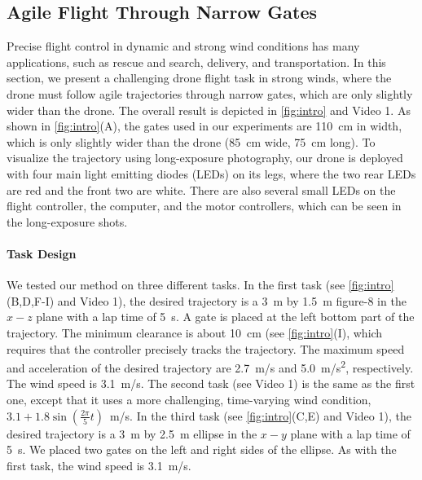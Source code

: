 \subsection*{Agile Flight Through Narrow Gates}
Precise flight control in dynamic and strong wind conditions has many applications, such as rescue and search, delivery, and transportation. In this section, we present a challenging drone flight task in strong winds, where the drone must follow agile trajectories through narrow gates, which are only slightly wider than the drone. The overall result is depicted in \cref{fig:intro} and Video 1. As shown in \cref{fig:intro}(A), the gates used in our experiments are \SI{110}{cm} in width, which is only slightly wider than the drone (\SI{85}{cm} wide, \SI{75}{cm} long). To visualize the trajectory using long-exposure photography, our drone is deployed with four main light emitting diodes (LEDs) on its legs, where the two rear LEDs are red and the front two are white. There are also several small LEDs on the flight controller, the computer, and the motor controllers, which can be seen in the long-exposure shots. 


\paragraph{Task Design} 
We tested our method on three different tasks. In the first task (see \cref{fig:intro}(B,D,F-I) and Video 1), the desired trajectory is a \SI{3}{m} by \SI{1.5}{m} figure-8 in the $x-z$ plane with a lap time of \SI{5}{s}. A gate is placed at the left bottom part of the trajectory. The minimum clearance is about \SI{10}{cm} (see \cref{fig:intro}(I), which requires that the controller precisely tracks the trajectory. The maximum speed and acceleration of the desired trajectory are \SI{2.7}{m/s} and \SI{5.0}{m/s^2}, respectively. The wind speed is \SI{3.1}{m/s}. The second task (see Video 1) is the same as the first one, except that it uses a more challenging, time-varying wind condition, $3.1+1.8\sin(\frac{2\pi}{5}t)$\SI{}{m/s}. In the third task (see \cref{fig:intro}(C,E) and Video 1), the desired trajectory is a \SI{3}{m} by \SI{2.5}{m} ellipse in the $x-y$ plane with a lap time of \SI{5}{s}. We placed two gates on the left and right sides of the ellipse. As with the first task, the wind speed is \SI{3.1}{m/s}.

